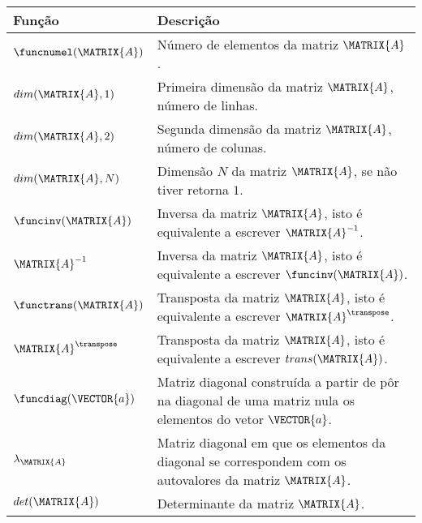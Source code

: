 \begin{notation}~\\
\begin{tabular}{p{} |  p{} }
\hline	
\textbf{Função} & \textbf{Descrição} \\ \hline
$\funcnumel(\MATRIX{A})$ & Número de elementos da matriz $\MATRIX{A}$. \\
\hline
$dim(\MATRIX{A},1)$ & Primeira dimensão da matriz $\MATRIX{A}$, número de linhas. \\
$dim(\MATRIX{A},2)$ & Segunda dimensão da matriz $\MATRIX{A}$, número de colunas. \\
$dim(\MATRIX{A},N)$ & Dimensão $N$ da matriz $\MATRIX{A}$, se não tiver retorna $1$. \\
\hline
$\funcinv(\MATRIX{A})$ & Inversa da matriz $\MATRIX{A}$, isto é equivalente a escrever $\MATRIX{A}^{-1}$. \\
$\MATRIX{A}^{-1}$ & Inversa da matriz $\MATRIX{A}$, isto é equivalente a escrever $\funcinv(\MATRIX{A})$. \\
\hline
$\functrans(\MATRIX{A})$ & Transposta da matriz $\MATRIX{A}$, isto é equivalente a escrever $\MATRIX{A}^{\transpose}$. \\
$\MATRIX{A}^{\transpose}$ & Transposta da matriz $\MATRIX{A}$, isto é equivalente a escrever $trans(\MATRIX{A})$. \\
\hline
$\funcdiag(\VECTOR{a})$ & Matriz diagonal construída a partir de pôr na diagonal de uma matriz nula os elementos do vetor $\VECTOR{a}$. \\
\hline
$\lambda_{\MATRIX{A}}$ & Matriz diagonal em que os elementos da diagonal se correspondem com os autovalores da matriz $\MATRIX{A}$. \\
\hline
$det(\MATRIX{A})$ & Determinante da matriz $\MATRIX{A}$. \\
\hline
\end{tabular}
\end{notation}

